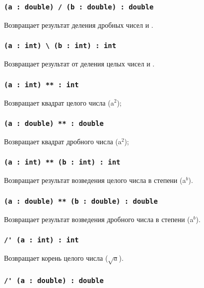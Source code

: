 \subsubsection{\lstinline|(a : double) / (b : double) : double|}

Возвращает результат деления дробных чисел  и .

\subsubsection{\lstinline|(a : int) \ (b : int) : int|}

Возвращает результат от деления целых чисел  и .


\subsubsection{\lstinline|(a : int) ** : int|}

Возвращает квадрат целого числа  (a$^2$);

\subsubsection{\lstinline|(a : double) ** : double|}

Возвращает квадрат дробного числа  (a$^2$);

\subsubsection{\lstinline|(a : int) ** (b : int) : int|}

Возвращает результат возведения целого числа  в степени  (a$^b$).

\subsubsection{\lstinline|(a : double) ** (b : double) : double|}

Возвращает результат возведения дробного числа  в степени  (a$^b$).

\subsubsection{\lstinline|/' (a : int) : int|}

Возвращает корень целого числа  ($\sqrt{a}$).

\subsubsection{\lstinline|/' (a : double) : double|}

